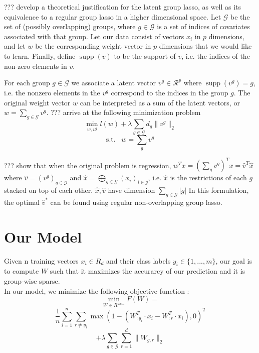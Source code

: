 \documentclass[11pt]{article}
\begin{document}
??? develop a theoretical justification for the latent group lasso, as well
as its equivalence to a regular group lasso in a higher dimensional space.
Let $\mathcal{G}$ be the set of (possibly overlapping) groups,
where $g \in \mathcal{G}$ is a set of indices of covariates associated with 
that group. 
Let our
data consist of vectors $x_i$ in $p$ dimensions, and let $w$ be the 
corresponding weight vector in $p$ dimensions that we would like to learn.
Finally, define $\operatorname{supp}(v)$ to be the support of $v$, i.e.
the indices of the non-zero elements in $v$.


For each group
$g \in \mathcal{G}$ we associate a latent vector $v^g \in \mathcal{R}^p$ where
$\operatorname{supp}(v^g) = g$, i.e. the nonzero elements in the $v^g$ correspond
to the indices in the group $g$. 
The original weight vector $w$ can be
interpreted as a sum of the latent vectors, or
$w = \sum_{g \in \mathcal{G}} v^g$. 
??? arrive at the following minimization
problem 
$$ \min_{w, v^g} l(w) + \lambda \sum_{g \in \mathcal{G}} d_g \|v^g \|_2 $$
$$\mathrm{s.t.}\;\;\; w = \sum_g v^g$$ 



??? show that when the original problem is regression, 
$w^Tx = \left(\sum_g v^g\right)^Tx = \hat{v}^T \hat{x}$ where 
$\hat{v} = (v^{g})_{g \in \mathcal{G}}$ and
$\hat{x} = \bigoplus_{g \in \mathcal{G} } (x_i)_{i \in g}$, i.e. $\hat{x}$ is
the restrictions of each $g$ stacked on top of each other. $\hat{x}, \hat{v}$ 
have dimension $\sum_{g \in \mathcal{G}} |g|$ 
In this formulation, the optimal $\hat{v}^*$ can be found using regular 
non-overlapping group lasso. 



\section{Our Model}

Given n training vectors $x_i \in R_d$ and their class labels $y_i \in \{1, ..., m\}$, our goal is to compute $W$ such that it maximizes the accurarcy of our prediction and it is group-wise sparse. \\

In our model, we minimize the following objective function : \\

$$ \min_{W \in R^{d x m}} F(W) = $$
$$\frac{1}{n} \sum_{i=1}^{n} \sum_{r \neq y_i } \max(1 - ( W_{:y_i}^T \cdot x_i - W_{:r}^T \cdot x_i) , 0 )^2 $$
$$ + \lambda \sum_{g \in \mathcal{G}} \sum_{r=1}^{d} \| W_{g,r} \|_2$$ \\
\end{document}
